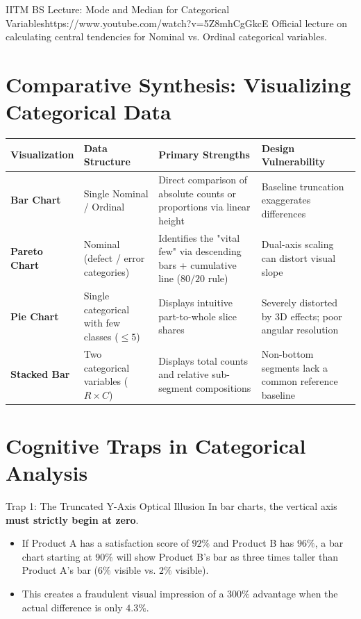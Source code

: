 \begin{videocard}{IITM BS Lecture: Mode and Median for Categorical Variables}{https://www.youtube.com/watch?v=5Z8mhCgGkcE}
Official lecture on calculating central tendencies for Nominal vs. Ordinal categorical variables.
\end{videocard}

\section{Comparative Synthesis: Visualizing Categorical Data}

\begin{center}
\renewcommand{\arraystretch}{1.3}
\begin{tabular}{p{2.6cm}p{3.5cm}p{3.8cm}p{3.5cm}}
\toprule
\textbf{Visualization} & \textbf{Data Structure} & \textbf{Primary Strengths} & \textbf{Design Vulnerability} \\
\midrule
\textbf{Bar Chart} & Single Nominal / Ordinal & Direct comparison of absolute counts or proportions via linear height & Baseline truncation exaggerates differences \\
\textbf{Pareto Chart} & Nominal (defect / error categories) & Identifies the "vital few" via descending bars + cumulative line ($80/20$ rule) & Dual-axis scaling can distort visual slope \\
\textbf{Pie Chart} & Single categorical with few classes ($\le 5$) & Displays intuitive part-to-whole slice shares & Severely distorted by 3D effects; poor angular resolution \\
\textbf{Stacked Bar} & Two categorical variables ($R \times C$) & Displays total counts and relative sub-segment compositions & Non-bottom segments lack a common reference baseline \\
\bottomrule
\end{tabular}
\end{center}

\section{Cognitive Traps in Categorical Analysis}

\begin{trapbox}{Trap 1: The Truncated Y-Axis Optical Illusion}
In bar charts, the vertical axis \textbf{must strictly begin at zero}.
\begin{itemize}
    \item If Product A has a satisfaction score of $92\%$ and Product B has $96\%$, a bar chart starting at $90\%$ will show Product B's bar as three times taller than Product A's bar ($6\%$ visible vs. $2\%$ visible).
    \item This creates a fraudulent visual impression of a $300\%$ advantage when the actual difference is only $4.3\%$.
\end{itemize}
\end{trapbox}

